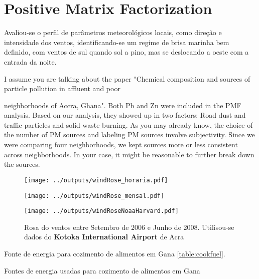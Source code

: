 \section{Positive Matrix Factorization}
Avaliou-se o perfil de parâmetros meteorológicos locais, como direção e intensidade dos ventos, 
identificando-se um regime de brisa marinha bem definido, com ventos de sul quando sol a pino, mas se deslocando a oeste com a entrada da noite. 

I assume you are talking about the paper "Chemical composition and sources of particle pollution in affluent and poor

neighborhoods of Accra, Ghana". Both Pb and Zn were included in the PMF analysis. Based on our analysis, they showed up in two factors: Road dust and traffic particles and solid waste burning. As you may already know, the choice of the number of PM sources and labeling PM sources involve subjectivity. Since we were comparing four neighborhoods, we kept sources more or less consistent across neighborhoods. In your case, it might be reasonable to further break down the sources.

\begin{figure}[H]
  \centering
  \texttt{[image: ../outputs/windRose\_horaria.pdf]}
  \caption{ \citep{carslaw2012} \label{fig:windRose_horaria}}
\end{figure}

\begin{figure}[H]
  \centering
  \texttt{[image: ../outputs/windRose\_mensal.pdf]}
  \caption{ \citep{carslaw2012} \label{fig:windRose_mensal}}
\end{figure}


\begin{figure}[H]
  \centering
  \texttt{[image: ../outputs/windRoseNoaaHarvard.pdf]}
  \caption{Rosa do ventos entre
           Setembro de 2006 e Junho de 2008. Utilisou-se dados 
           do \textbf{Kotoka International Airport} de Acra \label{fg:rosaCompleta}}
\end{figure}

Fonte de energia para cozimento de alimentos em Gana \ref{table:cookfuel}.
\begin{table}[H]
 \centering
  
  \caption{Fontes de energia usadas para cozimento de alimentos em 
           Gana \citep{ghanacensus2013} \label{table:cookfuel}}
\end{table}

